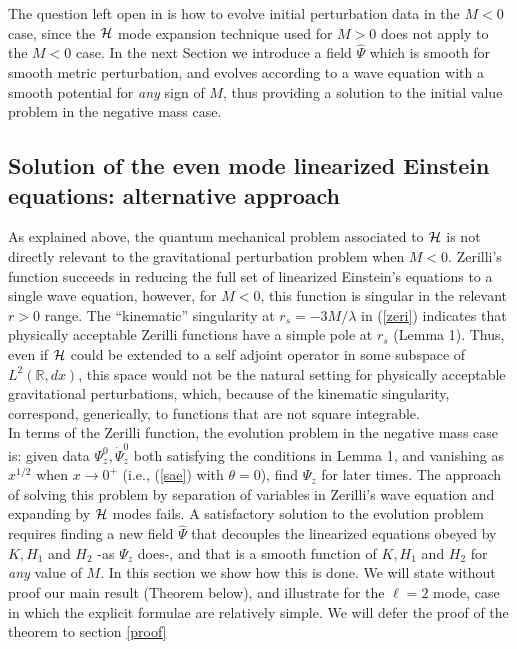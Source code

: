 \documentclass[aps,floats,showpacs,amssymb,tightenlines]{revtex4}
\begin{document}
The question left open in \cite{dg} is how to evolve initial perturbation data in the $M<0$ case, since the ${\cal H}$ mode
expansion technique used for $M>0$ does not apply to the $M<0$ case.  In the next Section we introduce a field $\hat \Psi$ which is smooth
for smooth metric perturbation, and evolves according to a wave equation with a smooth potential for {\em any} sign of $M$,
thus providing a solution to the initial value problem in the negative mass case.

   \subsection{Solution of the even mode linearized Einstein equations: alternative approach}


As explained above, the quantum mechanical problem associated to ${\cal H}$
 is not directly relevant to the gravitational perturbation problem when $M<0$.
Zerilli's function
succeeds in reducing the full set of linearized Einstein's equations to a single wave equation, however, for $M<0$, this function
is singular in the relevant $r>0$ range. The ``kinematic'' singularity at $r_s=-3M/\lambda$ in (\ref{zeri}) indicates
that physically acceptable Zerilli functions have a simple pole at $r_s$ (Lemma 1).
Thus, even if  ${\cal H}$ could be extended to a self adjoint operator in some subspace of  $L^2({\mathbb R},dx)$,
this space would not be the natural setting for physically acceptable gravitational perturbations, which, because of the kinematic singularity,
 correspond, generically, to functions that are not square integrable.\\

In terms of the Zerilli function, the evolution problem in the negative mass case is: given data $\Psi_z^0, \dot \Psi_z^0$ both satisfying
the conditions in Lemma 1, and vanishing as $x^{1/2}$  when $x \to 0^+$ (i.e., (\ref{sae}) with $\theta=0$),
 find $\Psi_z$ for later times. The approach of solving this problem by separation of variables in Zerilli's
 wave equation and expanding by ${\cal H}$ modes
fails.
A satisfactory solution to the evolution problem requires
finding a new field $\hat \Psi$ that decouples the linearized equations obeyed by $K, H_1$ and $H_2$ -as $\Psi_z$ does-, and
that is a smooth function of $K, H_1$ and $H_2$ for {\em any} value of $M$.
In this section we show how this is done. We will state without proof our main result (Theorem  below), and illustrate
for the $\ell=2$ mode, case in  which the explicit formulae are relatively simple. We will defer the proof of the theorem
to section \ref{proof}\\
\end{document}
